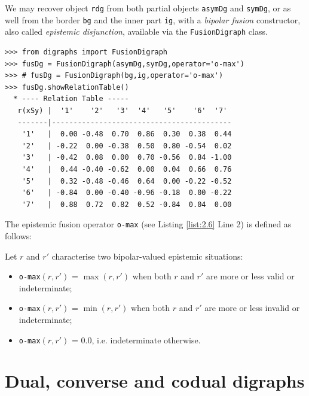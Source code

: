 We may recover object \texttt{rdg} from both partial objects \texttt{asymDg} and \texttt{symDg}, or as well from the border \texttt{bg} and the inner part \texttt{ig}, with a \emph{bipolar fusion} constructor, also called \emph{epistemic disjunction}, available via the \texttt{FusionDigraph} class. 
\begin{lstlisting}[caption={Epistemic fusion of partial diagraphs},label=list:2.6]
>>> from digraphs import FusionDigraph
>>> fusDg = FusionDigraph(asymDg,symDg,operator='o-max')
>>> # fusDg = FusionDigraph(bg,ig,operator='o-max')
>>> fusDg.showRelationTable()
  * ---- Relation Table -----
   r(xSy) |  '1'    '2'   '3'  '4'   '5'    '6'  '7'	  
   -------|------------------------------------------
    '1'   |  0.00 -0.48  0.70  0.86  0.30  0.38  0.44	 
    '2'   | -0.22  0.00 -0.38  0.50  0.80 -0.54  0.02	 
    '3'   | -0.42  0.08  0.00  0.70 -0.56  0.84 -1.00	 
    '4'   |  0.44 -0.40 -0.62  0.00  0.04  0.66  0.76	 
    '5'   |  0.32 -0.48 -0.46  0.64  0.00 -0.22 -0.52	 
    '6'   | -0.84  0.00 -0.40 -0.96 -0.18  0.00 -0.22	 
    '7'   |  0.88  0.72  0.82  0.52 -0.84  0.04  0.00
\end{lstlisting}
The epistemic fusion operator \texttt{o-max} (see Listing \ref{list:2.6} Line 2) is defined as follows:
\begin{definition}\label{def:disjunctiveFusion}

\noindent Let $r$ and $r'$ characterise two bipolar-valued epistemic situations:
\begin{itemize}[leftmargin=0.5cm,rightmargin=0.5cm,nosep]
\item \texttt{o-max}$(r, r')$ = $\max(r, r' )$ when both $r$ and $r'$ are more or less valid or indeterminate;
\item \texttt{o-max}$(r, r')$ = $\min(r, r' )$ when both $r$ and $r'$ are more or less invalid or indeterminate;
\item \texttt{o-max}$(r, r')$ = $0.0$, i.e. indeterminate otherwise.
\end{itemize}
\end{definition}
\section{Dual, converse and codual digraphs}
\label{sec:2.6}

